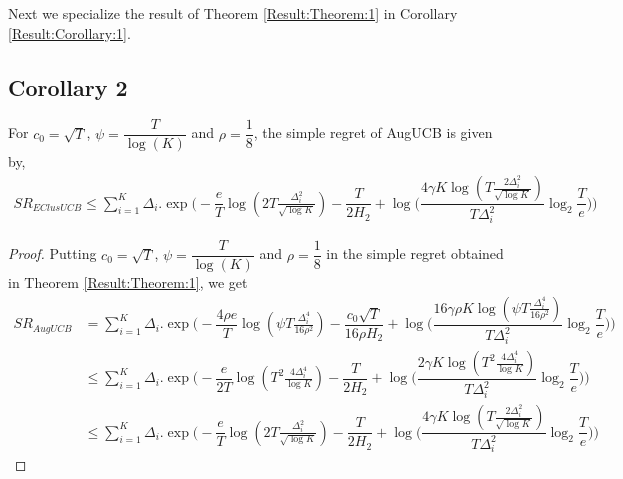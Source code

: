 	Next we specialize the result of Theorem \ref{Result:Theorem:1} in Corollary \ref{Result:Corollary:1}.

\subsection{Corollary 2}


\begin{corollary}
\label{Result:Corollary:1}
For $c_{0}=\sqrt{T}$, $\psi=\dfrac{T}{\log (K)}$ and $\rho=\dfrac{1}{8}$, the simple regret of AugUCB is given by,
\begin{align*}
SR_{EClusUCB} \leq  \sum_{i=1}^{K} \Delta_{i}.\exp\bigg(-\dfrac{e}{T}\log ( 2T\frac{\Delta_{i}^{2}}{\sqrt{\log K}})-\dfrac{T}{2 H_{2}} + \log \big( \dfrac{4\gamma K\log ( T \frac{2\Delta_{i}^{2}}{\sqrt{\log K}})}{T\Delta_{i}^{2}}\log_{2}\dfrac{T}{e} \big) \bigg)
\end{align*}
\end{corollary}

\begin{proof}
Putting $c_{0}=\sqrt{T}$, $\psi=\dfrac{T}{\log (K)}$ and $\rho=\dfrac{1}{8}$ in the simple regret obtained in Theorem \ref{Result:Theorem:1}, we get
\begin{align*}
SR_{AugUCB} &= \sum_{i=1}^{K} \Delta_{i}. \exp\bigg(-\dfrac{4\rho e}{T}\log (\psi T\frac{\Delta_{i}^{4}}{16\rho^{2}})-\dfrac{c_{0}\sqrt{T}}{16\rho H_{2}} + \log \big( \dfrac{16\gamma\rho K\log (\psi T \frac{\Delta_{i}^{4}}{16\rho^{2}})}{T\Delta_{i}^{2}}\log_{2}\dfrac{T}{e} \big) \bigg)\\
&\leq \sum_{i=1}^{K} \Delta_{i}.\exp\bigg(-\dfrac{e}{2T}\log ( T^{2}\frac{4\Delta_{i}^{4}}{\log K})-\dfrac{T}{2 H_{2}} + \log \big( \dfrac{2\gamma K\log ( T^{2} \frac{4\Delta_{i}^{4}}{\log K})}{T\Delta_{i}^{2}}\log_{2}\dfrac{T}{e} \big) \bigg)\\
&\leq \sum_{i=1}^{K} \Delta_{i}.\exp\bigg(-\dfrac{e}{T}\log ( 2T\frac{\Delta_{i}^{2}}{\sqrt{\log K}})-\dfrac{T}{2 H_{2}} + \log \big( \dfrac{4\gamma K\log ( T \frac{2\Delta_{i}^{2}}{\sqrt{\log K}})}{T\Delta_{i}^{2}}\log_{2}\dfrac{T}{e} \big) \bigg)
\end{align*} 

\end{proof}